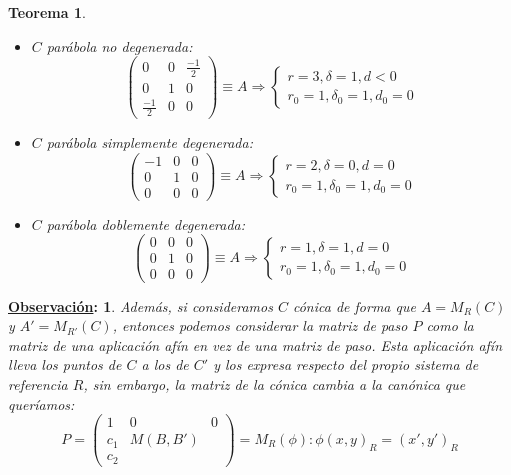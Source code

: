 \documentclass[10pt,a4paper,openright]{book}
\theoremstyle{break}
\newtheorem*{theo}{Teorema}
\newtheorem*{obs}{\underline{Observación}:}
\begin{document}
\begin{theo}
\begin{itemize}
\item $C$ parábola no degenerada:
$$\left(\begin{array}{c|cc}
0 & 0 & \frac{-1}{2} \\
\hline
0 & 1  & 0  \\
\frac{-1}{2} &  0 & 0
\end{array}
\right) \equiv A \Rightarrow \begin{cases} r= 3 , \delta = 1, d < 0 \\ r_0 = 1, \delta_0 = 1, d_0 = 0 \end{cases}$$
\item $C$ parábola simplemente degenerada:
$$\left(\begin{array}{c|cc}
-1 & 0 & 0 \\
\hline
0 & 1  & 0  \\
0 &  0 & 0
\end{array}
\right) \equiv A \Rightarrow \begin{cases} r= 2 , \delta = 0, d = 0 \\ r_0 = 1, \delta_0 = 1, d_0 = 0 \end{cases}$$
\item $C$ parábola doblemente degenerada:
$$\left(\begin{array}{c|cc}
0 & 0 & 0 \\
\hline
0 & 1  & 0  \\
0 &  0 & 0
\end{array}
\right) \equiv A \Rightarrow \begin{cases} r= 1, \delta = 1, d = 0 \\ r_0 = 1, \delta_0 = 1, d_0 = 0 \end{cases}$$
\end{itemize}
\end{theo}

\begin{obs}
Además, si consideramos $C$ cónica de forma que $A = M_R (C)$ y $A' = M_{R'} (C)$, entonces podemos considerar la matriz de paso $P$ como la matriz de una aplicación afín en vez de una matriz de paso. Esta aplicación afín lleva los puntos de $C$ a los de $C'$ y los expresa respecto del propio sistema de referencia $R$, sin embargo, la matriz de la cónica cambia a la canónica que queríamos:
$$P=\left(\begin{array}{c|cc}
1 & 0 & 0 \\
\hline
c_1 & M(B, B')  &   \\
c_2 &  &
\end{array}
\right) = M_R (\phi) : \phi (x,y)_R = (x', y')_R $$
\end{obs}
\end{document}
